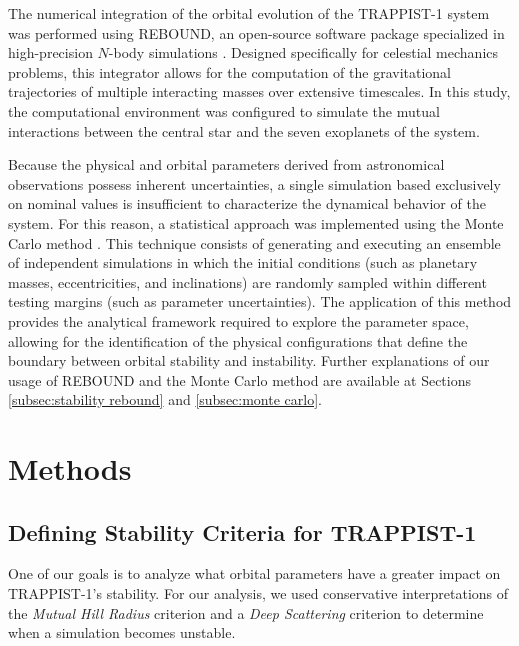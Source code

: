 \documentclass{aa}
\begin{document}
The numerical integration of the orbital evolution of the TRAPPIST-1 system was performed using REBOUND, an open-source software package specialized in high-precision $N$-body simulations \citep{2012A&A...537A.128R}. Designed specifically for celestial mechanics problems, this integrator allows for the computation of the gravitational trajectories of multiple interacting masses over extensive timescales. In this study, the computational environment was configured to simulate the mutual interactions between the central star and the seven exoplanets of the system.%

Because the physical and orbital parameters derived from astronomical observations possess inherent uncertainties, a single simulation based exclusively on nominal values is insufficient to characterize the dynamical behavior of the system. For this reason, a statistical approach was implemented using the Monte Carlo method \citep{Metropolis01091949}. This technique consists of generating and executing an ensemble of independent simulations in which the initial conditions (such as planetary masses, eccentricities, and inclinations) are randomly sampled within different testing margins (such as parameter uncertainties). The application of this method provides the analytical framework required to explore the parameter space, allowing for the identification of the physical configurations that define the boundary between orbital stability and instability. Further explanations of our usage of REBOUND and the Monte Carlo method are available at Sections \ref{subsec:stability rebound} and \ref{subsec:monte carlo}.


\section{Methods}
\label{sec:methods}
\subsection{Defining Stability Criteria for TRAPPIST-1}
\label{subsec:stability_criteria}
One of our goals is to analyze what orbital parameters have a greater impact on TRAPPIST-1's stability. For our analysis, we used conservative interpretations of the \textit{Mutual Hill Radius} criterion and a \textit{Deep Scattering} criterion to determine when a simulation becomes unstable.
\end{document}
